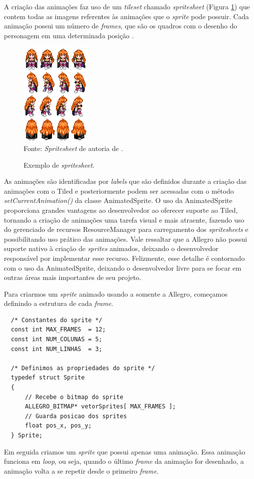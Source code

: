 %
%
A criação das animações faz uso de um \textit{tileset} chamado \textit{spritesheet} (Figura \ref{sprite}) que contem todas as imagens referentes às animações que o \textit{sprite} pode possuir. Cada animação possui um número de \textit{frames}, que são os quadros com o desenho do personagem em uma determinada posição \cite{GEDIGames}.
%
%
%
\begin{figure}[H]
    \centering
    \caption{Exemplo de \textit{spritesheet}.}
    \label{sprite}
    \includegraphics[scale = 1]{Imagens/sprite.png}
    \\Fonte: \textit{Spritesheet} de autoria de \cite{Sithjester}.
\end{figure}
%
%
\par 
As animações são identificadas por \textit{labels} que são definidos durante a criação das animações com o Tiled e posteriormente podem ser acessadas com o método \textit{setCurrentAnimation()} da classe AnimatedSprite. O uso da AnimatedSprite proporciona grandes vantagens ao desenvolvedor ao oferecer suporte ao Tiled, tornando a criação de animações uma tarefa visual e mais atraente, fazendo uso do gerenciado de recursos ResourceManager para carregamento dos \textit{spritesheets} e possibilitando uso prático das animações. Vale ressaltar que a Allegro não possui suporte nativo à criação de \textit{sprites} animados, deixando o desenvolvedor responsável por implementar esse recurso. Felizmente, esse detalhe é contornado com o uso da AnimatedSprite, deixando o desenvolvedor livre para se focar em outras áreas mais importantes de seu projeto.
%
\par 
Para criarmos um \textit{sprite} animado usando a somente a Allegro, começamos definindo a estrutura de cada \textit{frame}.
%
\begin{lstlisting}
  /* Constantes do sprite */
  const int MAX_FRAMES  = 12;
  const int NUM_COLUNAS = 5;
  const int NUM_LINHAS  = 3;
  
  /* Definimos as propriedades do sprite */
  typedef struct Sprite
  {
      // Recebe o bitmap do sprite
      ALLEGRO_BITMAP* vetorSprites[ MAX_FRAMES ];
      // Guarda posicao dos sprites
      float pos_x, pos_y;
  } Sprite;
\end{lstlisting}
%
Em seguida criamos um \textit{sprite} que possui apenas uma animação. Essa animação funciona em \textit{loop}, ou seja, quando o último \textit{frame} da animação for desenhado, a animação volta a se repetir desde o primeiro \textit{frame}.
%

%

